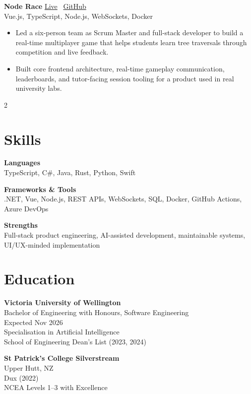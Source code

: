 \documentclass[9pt,letterpaper]{article}
\newcommand{\smallmuted}[1]{{\small\color{ResumeMuted} #1}}
\newcommand{\resumeProject}[4]{
  \Needspace{4\baselineskip}
  \vspace{0.12em}
  \textbf{#1} \hfill {\small #2} \\
  \smallmuted{#3} \\
  \vspace{0.08em}
  #4
}
\begin{document}
\resumeProject
  {Node Race}
  {\href{https://noderace.online}{Live} \textbar\ \href{https://github.com/Team-GitGud/node-race}{GitHub}}
  {Vue.js, TypeScript, Node.js, WebSockets, Docker}
  {
    \begin{itemize}
      \item Led a six-person team as Scrum Master and full-stack developer to build a real-time multiplayer game that helps students learn tree traversals through competition and live feedback.
      \item Built core frontend architecture, real-time gameplay communication, leaderboards, and tutor-facing session tooling for a product used in real university labs.
    \end{itemize}
  }

\vspace{0.02em}
\begin{multicols}{2}
\section*{Skills}
\textbf{Languages} \\
TypeScript, C\#, Java, Rust, Python, Swift

\vspace{0.2em}
\textbf{Frameworks \& Tools} \\
.NET, Vue, Node.js, REST APIs, WebSockets, SQL, Docker, GitHub Actions, Azure DevOps

\vspace{0.2em}
\textbf{Strengths} \\
Full-stack product engineering, AI-assisted development, maintainable systems, UI/UX-minded implementation

\columnbreak

\section*{Education}
\textbf{Victoria University of Wellington} \\
\smallmuted{Bachelor of Engineering with Honours, Software Engineering} \\
\smallmuted{Expected Nov 2026} \\
Specialisation in Artificial Intelligence \\
School of Engineering Dean's List (2023, 2024)

\vspace{0.25em}
\textbf{St Patrick's College Silverstream} \\
\smallmuted{Upper Hutt, NZ} \\
Dux (2022) \\
NCEA Levels 1--3 with Excellence
\end{multicols}
\end{document}
